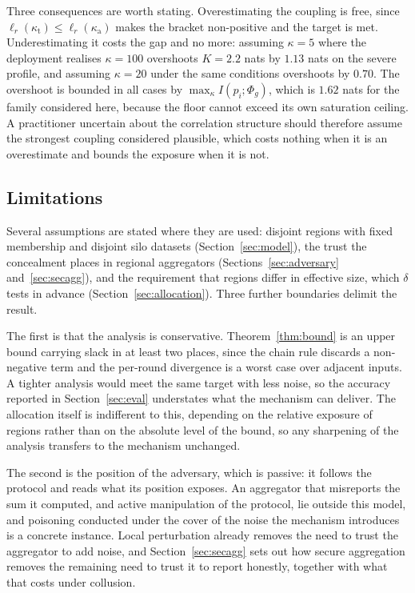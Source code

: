 \documentclass[acmsmall,screen,review,anonymous]{acmart}
\theoremstyle{acmdefinition}%
\begin{document}
Three consequences are worth stating. Overestimating the coupling is free, since
$\ell_r(\kappa_{\mathrm{t}}) \le \ell_r(\kappa_{\mathrm{a}})$ makes the bracket
non-positive and the target is met. Underestimating it costs the gap and no more:
assuming $\kappa = 5$ where the deployment realises $\kappa = 100$ overshoots
$K = 2.2$ nats by $1.13$ nats on the severe profile, and assuming $\kappa = 20$
under the same conditions overshoots by $0.70$. The overshoot is bounded in all
cases by $\max_\kappa I(p_i;\Phi_g)$, which is $1.62$ nats for the family considered
here, because the floor cannot exceed its own saturation ceiling. A practitioner
uncertain about the correlation structure should therefore assume the strongest
coupling considered plausible, which costs nothing when it is an overestimate and
bounds the exposure when it is not.

\subsection{Limitations}
\label{sec:limitations}

Several assumptions are stated where they are used: disjoint regions with fixed membership
and disjoint silo datasets (Section~\ref{sec:model}), the trust the concealment places in
regional aggregators (Sections~\ref{sec:adversary} and~\ref{sec:secagg}), and the
requirement that regions differ in effective size, which $\delta$ tests in advance
(Section~\ref{sec:allocation}). Three further boundaries delimit the result.

The first is that the analysis is conservative. Theorem~\ref{thm:bound} is an upper bound
carrying slack in at least two places, since the chain rule discards a non-negative term and
the per-round divergence is a worst case over adjacent inputs. A tighter analysis would meet
the same target with less noise, so the accuracy reported in Section~\ref{sec:eval}
understates what the mechanism can deliver. The allocation itself is indifferent to this,
depending on the relative exposure of regions rather than on the absolute level of the
bound, so any sharpening of the analysis transfers to the mechanism unchanged.

The second is the position of the adversary, which is passive: it follows the protocol and
reads what its position exposes. An aggregator that misreports the sum it computed, and
active manipulation of the protocol, lie outside this model, and poisoning conducted under
the cover of the noise the mechanism introduces \cite{zheng2025dppoison} is a concrete
instance. Local perturbation already removes the need to trust the aggregator to add noise,
and Section~\ref{sec:secagg} sets out how secure aggregation removes the remaining need to
trust it to report honestly, together with what that costs under collusion.
\end{document}

